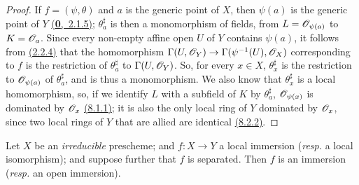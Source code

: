 \begin{proof}
\label{proof-prop-1.8.2.7}
If $f=(\psi,\theta)$ and $a$ is the generic point of $X$, then
$\psi(a)$ is the generic point of $Y$ \hyperref[env-0.2.1.5]{(\textbf{0},~2.1.5)}; $\theta_a^\sharp$ is then
a monomorphism of fields, from $L=\mathscr{O}_{\psi(a)}$ to $K=\mathscr{O}_a$. Since every
non-empty affine open $U$ of $Y$ contains $\psi(a)$, it follows from
\hyperref[prop-1.2.2.4]{(2.2.4)} that the homomorphism $\Gamma(U,\mathscr{O}_Y)\to\Gamma(\psi^{-1}(U),\mathscr{O}_X)$
corresponding to $f$ is the restriction of $\theta_a^\sharp$ to $\Gamma(U,\mathscr{O}_Y)$.
So, for every $x\in X$, $\theta_x^\sharp$ is the restriction to $\mathscr{O}_{\psi(a)}$ of
$\theta_a^\sharp$, and is thus a monomorphism. We also know that $\theta_x^\sharp$ is a
local homomorphism, so, if we identify $L$ with a subfield of $K$ by
$\theta_a^\sharp$, $\mathscr{O}_{\psi(x)}$ is dominated by $\mathscr{O}_x$ \hyperref[lem-1.8.1.1]{(8.1.1)}; it is also
the only local ring of $Y$ dominated by $\mathscr{O}_x$, since two local rings of $Y$
that are allied are identical \hyperref[prop-1.8.2.2]{(8.2.2)}.
\end{proof}

\begin{prop}[8.2.8]
\label{prop-1.8.2.8}
Let $X$ be an {\em irreducible} prescheme; and
$f:X\to Y$ a local immersion ({\em resp.} a local isomorphism); and
suppose further that $f$ is separated. Then $f$ is an immersion ({\em resp.}
an open immersion).
\end{prop}

